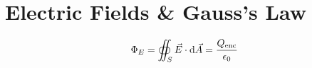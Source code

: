 \chapter{Electric Fields \& Gauss's Law}

\[\Phi_E = \oiint_S \vec{E}\cdot\dif\vec{A} = \frac{Q_{\mathrm{enc}}}{\epsilon_0}\]

